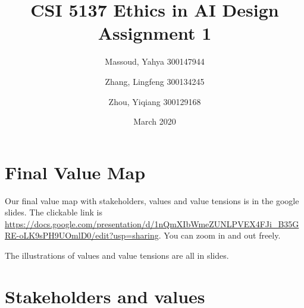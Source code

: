 \documentclass{article}
\title{CSI 5137 Ethics in AI Design Assignment 1}
\author{Massoud, Yahya 300147944 \and Zhang, Lingfeng 300134245 \and Zhou, Yiqiang 300129168}
\date{March 2020}
\begin{document}
\maketitle

\section{Final Value Map}

Our final value map with stakeholders, values and value tensions is in the google slides. The clickable link is \href{https://docs.google.com/presentation/d/1nQmXIbWmeZUNLPVEX4FJi_B35GRE-oLK9sPH9UOmlD0/edit?usp=sharing}{\url{https://docs.google.com/presentation/d/1nQmXIbWmeZUNLPVEX4FJi_B35GRE-oLK9sPH9UOmlD0/edit?usp=sharing}}. You can zoom in and out freely.

The illustrations of values and value tensions are all in slides.

\section{Stakeholders and values}
\end{document}
